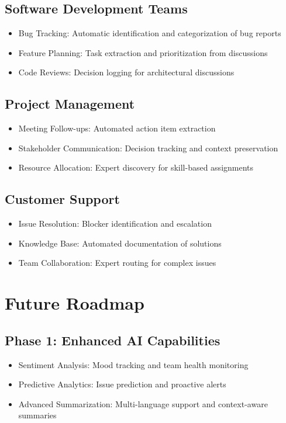 \documentclass[12pt,a4paper]{article}
\begin{document}
\subsection{Software Development Teams}
\begin{itemize}
    \item Bug Tracking: Automatic identification and categorization of bug reports
    \item Feature Planning: Task extraction and prioritization from discussions
    \item Code Reviews: Decision logging for architectural discussions
\end{itemize}
\subsection{Project Management}
\begin{itemize}
    \item Meeting Follow-ups: Automated action item extraction
    \item Stakeholder Communication: Decision tracking and context preservation
    \item Resource Allocation: Expert discovery for skill-based assignments
\end{itemize}
\subsection{Customer Support}
\begin{itemize}
    \item Issue Resolution: Blocker identification and escalation
    \item Knowledge Base: Automated documentation of solutions
    \item Team Collaboration: Expert routing for complex issues
\end{itemize}
\section{Future Roadmap}
\subsection{Phase 1: Enhanced AI Capabilities}
\begin{itemize}
    \item Sentiment Analysis: Mood tracking and team health monitoring
    \item Predictive Analytics: Issue prediction and proactive alerts
    \item Advanced Summarization: Multi-language support and context-aware summaries
\end{itemize}
\end{document}
